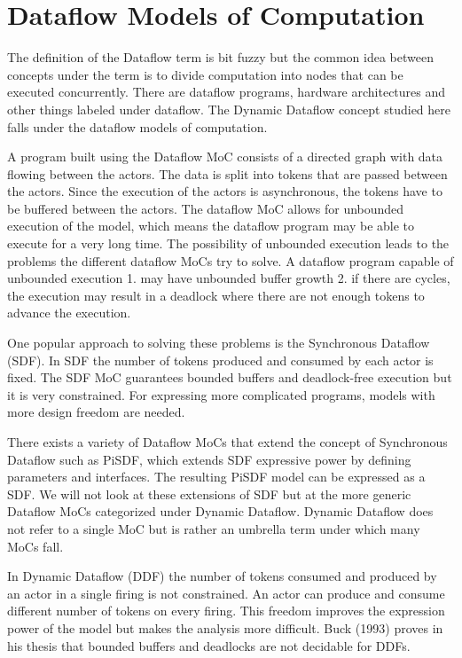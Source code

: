\chapter{Dataflow Models of Computation}
\label{chapter:dataflow}
The definition of the Dataflow term is bit fuzzy but the common idea between concepts under the term is to divide computation into nodes that can be executed concurrently. There are dataflow programs, hardware architectures and other things labeled under dataflow. The Dynamic Dataflow concept studied here falls under the dataflow models of computation.

A program built using the Dataflow MoC consists of a directed graph with data flowing between the actors. The data is split into tokens that are passed between the actors. Since the execution of the actors is asynchronous, the tokens have to be buffered between the actors. The dataflow MoC allows for unbounded execution of the model, which means the dataflow program may be able to execute for a very long time. The possibility of unbounded execution leads to the problems the different dataflow MoCs try to solve. A dataflow program capable of unbounded execution 1. may have unbounded buffer growth 2. if there are cycles, the execution may result in a deadlock where there are not enough tokens to advance the execution.

One popular approach to solving these problems is the Synchronous Dataflow (SDF). In SDF the number of tokens produced and consumed by each actor is fixed.  The SDF MoC guarantees bounded buffers and deadlock-free execution but it is very constrained. For expressing more complicated programs, models with more design freedom are needed.

There exists a variety of Dataflow MoCs that extend the concept of Synchronous Dataflow such as PiSDF, which extends SDF expressive power by defining parameters and interfaces. The resulting PiSDF model can be expressed as a SDF. We will not look at these extensions of SDF but at the more generic Dataflow MoCs categorized under Dynamic Dataflow. Dynamic Dataflow does not refer to a single MoC but is rather an umbrella term under which many MoCs fall.

In Dynamic Dataflow (DDF) the number of tokens consumed and produced by an actor in a single firing is not constrained. An actor can produce and consume different number of tokens on every firing. This freedom improves the expression power of the model but makes the analysis more difficult. Buck (1993) proves in his thesis that bounded buffers and deadlocks are not decidable for DDFs.


